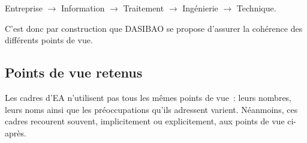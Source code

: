 \begin{center}
Entreprise $\rightarrow$ Information $\rightarrow$ Traitement $\rightarrow$ Ingénierie $\rightarrow$ Technique.
\end{center}

C'est donc par construction que DASIBAO se propose d'assurer la cohérence des
différents points de vue.




\subsection{Points de vue retenus}
Les cadres d'EA n'utilisent pas tous les mêmes points de vue~: leurs nombres,
leurs noms ainsi que les préoccupations qu'ils adressent varient. Néanmoins,
ces cadres recourent souvent, implicitement ou explicitement, aux points de vue
ci-après.

